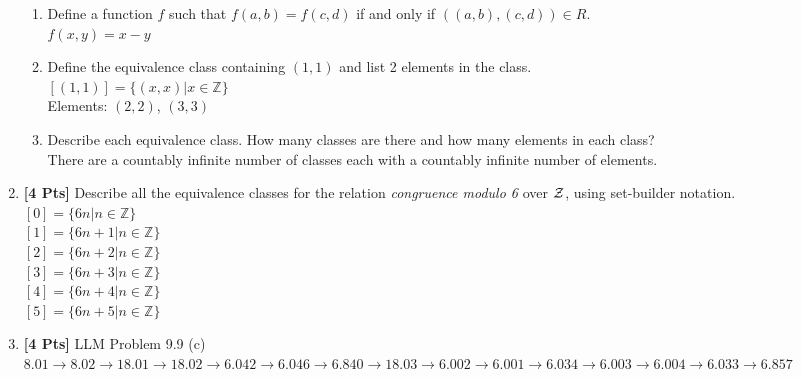 \documentclass[11pt]{article}
\begin{document}
\begin{enumerate}
\begin{enumerate}
\item Define a function $f$ such that $f(a,b) = f(c,d)$ if and only if $((a,b), (c,d)) \in R$.\\

$f(x,y) = x - y$\\

\item Define the equivalence class containing $(1,1)$ and list 2 elements in the class.\\

$[(1,1)] = \{ (x,x) | x \in  \mathbb{Z}\}$\\

Elements: $(2,2)$, $(3,3)$\\

\item Describe each equivalence class. How many classes are there and how many elements in each class?\\

There are a countably infinite number of classes each with a countably infinite number of elements.

\end{enumerate}

\clearpage

\item {\bf [4 Pts]} Describe all the equivalence classes for the relation {\it congruence modulo 6} over $\cal Z$, using set-builder notation.\\
$[0] = \{ 6n | n \in \mathbb{Z} \}$\\
$[1] = \{ 6n + 1 | n \in \mathbb{Z} \}$\\
$[2] = \{ 6n + 2 | n \in \mathbb{Z} \}$\\
$[3] = \{ 6n + 3 | n \in \mathbb{Z} \}$\\
$[4] = \{ 6n + 4 | n \in \mathbb{Z} \}$\\
$[5] = \{ 6n + 5 | n \in \mathbb{Z} \}$\\

\item {\bf [4 Pts]} LLM Problem 9.9 (c)\\
$8.01 \rightarrow 8.02 \rightarrow 18.01 \rightarrow 18.02 \rightarrow 6.042 \rightarrow 6.046 \rightarrow 6.840 \rightarrow 18.03 \rightarrow 6.002 \rightarrow 6.001 \rightarrow 6.034 \rightarrow 6.003 \rightarrow 6.004 \rightarrow 6.033 \rightarrow 6.857$\\

\end{enumerate}
\end{document}
